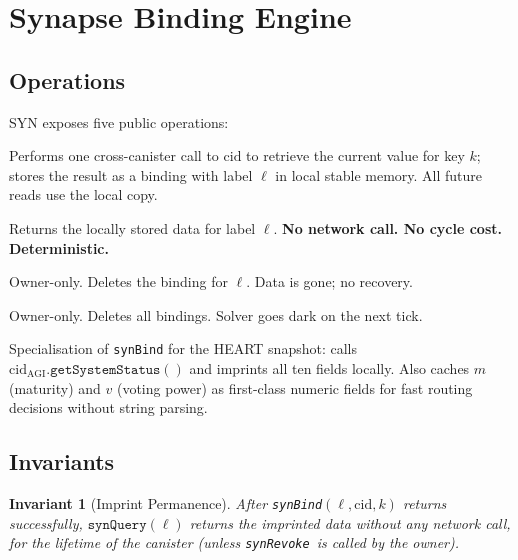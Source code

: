 \documentclass[12pt]{article}
\newtheorem{invariant}[theorem]{Invariant}
\newcommand{\synBind}{\texttt{synBind}}
\newcommand{\synQuery}{\texttt{synQuery}}
\newcommand{\synRevoke}{\texttt{synRevoke}}
\begin{document}
\section{Synapse Binding Engine}
\label{sec:syn}

\subsection{Operations}

SYN exposes five public operations:

\begin{description}[leftmargin=1.8cm, labelwidth=1.6cm]
  \item[\synBind$(\ell, \mathrm{cid}, k)$]
    Performs one cross-canister call to $\mathrm{cid}$ to retrieve the current
    value for key $k$; stores the result as a binding with label $\ell$ in
    local stable memory.  All future reads use the local copy.
  \item[\synQuery$(\ell)$]
    Returns the locally stored data for label $\ell$.
    \textbf{No network call.  No cycle cost.  Deterministic.}
  \item[\synRevoke$(\ell)$]
    Owner-only.  Deletes the binding for $\ell$.  Data is gone; no recovery.
  \item[$\synRevoke$All$()$]
    Owner-only.  Deletes all bindings.  Solver goes dark on the next tick.
  \item[\texttt{synBindHeart}$(\mathrm{cid}_\text{AGI})$]
    Specialisation of \synBind{} for the HEART snapshot: calls
    $\mathrm{cid}_\text{AGI}.\texttt{getSystemStatus}()$ and imprints all ten
    fields locally.  Also caches $m$ (maturity) and $v$ (voting power) as
    first-class numeric fields for fast routing decisions without string parsing.
\end{description}

\subsection{Invariants}

\begin{invariant}[Imprint Permanence]
  After \synBind$(\ell, \mathrm{cid}, k)$ returns successfully, $\synQuery(\ell)$
  returns the imprinted data without any network call, for the lifetime of the
  canister (unless \synRevoke\ is called by the owner).
\end{invariant}
\end{document}
